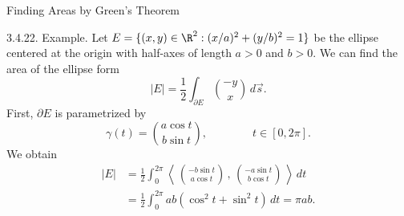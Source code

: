 \documentclass[smaller,hyperref={CJKbookmarks=true}]{beamer}
\newcommand{\scp}[2]{\left\langle\,#1\,,\,#2\,\right\rangle} \newcommand{\scpp}{\langle\,\cdot\,,\,\cdot\,\rangle}
\begin{document}
\begin{frame}[t]{Finding Areas by Green's Theorem}
\begin{spacing}{1}
\alert{3.4.22. Example.} Let $E=\{(x,y)\in\R^2:(x/a)^2+(y/b)^2=1\}$ be the ellipse centered at the origin with half-axes of length $a>0$ and $b>0$. We can find the area of the ellipse form
\[|E|=\frac{1}{2}\int_{\partial E}\binom{-y}{x}\,d\vec{s}.\]
First, $\partial E$ is parametrized by
\[\gamma(t)=\binom{a\cos t}{b\sin t},\qquad\qquad t\in[0,2\pi].\]
We obtain
\begin{equation*}
  \begin{split}
     |E| &=\frac{1}{2}\int_{0}^{2\pi}
     \scp{\binom{-b\sin t}{a\cos t}}{\binom{-a\sin t}{b\cos t}}\,dt \\
       &=\frac{1}{2}\int_{0}^{2\pi}
       ab(\cos^2t+\sin^2t)\,dt=\pi ab.
  \end{split}
\end{equation*}
\end{spacing}
\end{frame}
\end{document}
